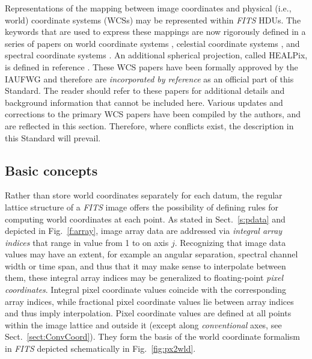 \documentclass[onecolumn]{aa}
\begin{document}
Representations of the mapping between image coordinates and physical (i.e.,
world) coordinate systems (WCSs) may be represented within {\em FITS\/} HDUs. The keywords
that are used to express these mappings are now rigorously defined in a
series of papers on
world coordinate systems \citep{greisen02}, celestial coordinate systems
\citep{calabretta02}, and spectral coordinate systems \citep{greisen06}.  
An additional spherical projection, called HEALPix, is defined in reference 
\citep{calabretta07}.
These WCS papers have been formally
approved by the IAUFWG and therefore are {\em incorporated by reference} as an
official part of this Standard. The reader should refer to these papers for
additional details and background information that cannot be included here.
Various updates and corrections to the primary WCS papers have been compiled by
the authors, and are reflected in this section. Therefore, where conflicts exist,
the description in this Standard will prevail. 

\subsection{Basic concepts}

Rather than store world coordinates separately for each datum,
the regular lattice structure of a {\em FITS\/} image offers the
possibility of defining rules for computing world coordinates
at each point.  As stated in Sect.\ \ref{s:pdata} and
depicted in Fig.~\ref{f:array}, 
image array data are addressed via {\em integral
array indices} that range in value from 1 to  on axis $j$.
Recognizing that image data values may have an extent, for example an
angular separation, spectral channel width or time span, and thus that
it may make sense to interpolate between them, these integral array
indices may be generalized to floating-point {\em pixel coordinates}.
Integral pixel coordinate values coincide with the corresponding array
indices, while fractional pixel coordinate values lie between array
indices and thus imply interpolation.  Pixel coordinate values are
defined at all points within the image lattice and outside it (except
along {\em conventional} axes, see Sect.\ \ref{sect:ConvCoord}). They form the basis of
the world coordinate formalism in {\em FITS\/} depicted schematically in 
Fig.~\ref{fig:px2wld}. 
  
\end{document}
